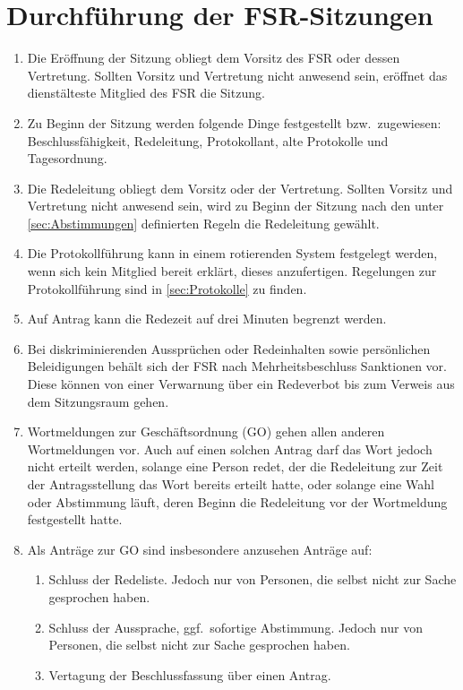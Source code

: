 \documentclass[
	a4paper,
	12pt,
	oneside,
	parskip=half-,
	pagesize,
	headsepline,
	german,
	ngerman
]{scrartcl}
\begin{document}
\section{Durchführung der FSR-Sitzungen}
\label{sec:Sitzung-B}
\begin{enumerate}
	\item Die Eröffnung der Sitzung obliegt dem Vorsitz des FSR oder dessen Vertretung. Sollten Vorsitz und Vertretung nicht anwesend sein, eröffnet das dienstälteste Mitglied des FSR die Sitzung.  
	\item Zu Beginn der Sitzung werden folgende Dinge festgestellt bzw.\ zugewiesen: Beschlussfähigkeit, Redeleitung, Protokollant, alte Protokolle und Tagesordnung.
	\item Die Redeleitung obliegt dem Vorsitz oder der Vertretung. Sollten Vorsitz und Vertretung nicht anwesend sein, wird zu Beginn der Sitzung nach den unter \ref{sec:Abstimmungen} definierten Regeln die Redeleitung gewählt.
	\item Die Protokollführung kann in einem rotierenden System festgelegt werden, wenn sich kein Mitglied bereit erklärt, dieses anzufertigen. Regelungen zur Protokollführung sind in \ref{sec:Protokolle} zu finden.
	\item Auf Antrag kann die Redezeit auf drei Minuten begrenzt werden.
	\item Bei diskriminierenden Aussprüchen oder Redeinhalten sowie persönlichen Beleidigungen behält sich der FSR nach Mehrheitsbeschluss Sanktionen vor. Diese können von einer Verwarnung über ein Redeverbot bis zum Verweis aus dem Sitzungsraum gehen.
	\item Wortmeldungen zur Geschäftsordnung (GO) gehen allen anderen Wortmeldungen vor. Auch auf einen solchen Antrag darf das Wort jedoch nicht erteilt werden, solange eine Person redet, der die Redeleitung zur Zeit der Antragsstellung das Wort bereits erteilt hatte, oder solange eine Wahl oder Abstimmung läuft, deren Beginn die Redeleitung vor der Wortmeldung festgestellt hatte.
	\item Als Anträge zur GO sind insbesondere anzusehen Anträge auf:
	\begin{enumerate}
		\item Schluss der Redeliste. Jedoch nur von Personen, die selbst nicht zur Sache gesprochen haben.
		\item Schluss der Aussprache, ggf.\ sofortige Abstimmung. Jedoch nur von Personen, die selbst nicht zur Sache gesprochen haben.
		\item Vertagung der Beschlussfassung über einen Antrag.

\end{enumerate}
\end{enumerate}
\end{document}
